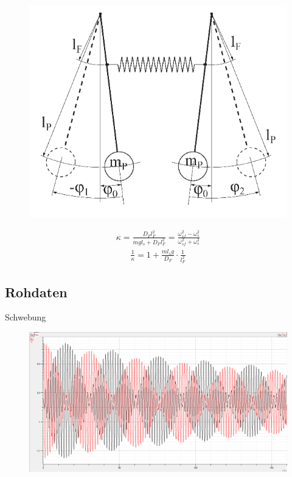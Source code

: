 \documentclass[11pt]{beamer}
\begin{document}
\begin{frame}
\begin{figure}[H]
\centering
\includegraphics[scale=0.5]{Bilder/Gekoppeltes-Pendel.PNG}
\end{figure}
\begin{align*}
\kappa =\frac{D_F l_F^2}{mgl_s + D_F l_F^2}= \frac{\omega_{sf}^2-\omega_{s}^2}{\omega_{sf}^2+\omega_s^2}
\end{align*}
\begin{align*}
\frac{1}{\kappa}=1+\frac{ml_sg}{D_F}\cdot \frac{1}{l_F^2}
\end{align*}
\end{frame}

\subsection{Rohdaten}
\begin{frame}{Schwebung}
\begin{figure}[H]
\centering
\includegraphics[scale=0.4]{Bilder/Schwebung.png}
\end{figure}
\end{frame}
\end{document}
